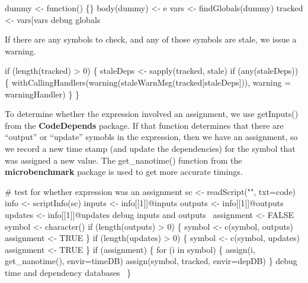 \documentclass[a4paper]{article}%
\newcommand{\pkg}[1]{{\bf #1}}
\begin{document}
\nwenddocs{}\endmoddef\nwstartdeflinemarkup{}\nwenddeflinemarkup
dummy <- function() \{\}
body(dummy) <- e
vars <- findGlobals(dummy)
tracked <- vars[vars %
\LA{}debug globals~{\nwtagstyle{}}\RA{}
\nwendcode{}\nwdocspar

If there are any symbols to check, and any of those symbols
are stale, we issue a warning.

\nwenddocs{}\endmoddef\nwstartdeflinemarkup{}\nwenddeflinemarkup
if (length(tracked) > 0) \{
    staleDeps <- sapply(tracked, stale)
    if (any(staleDeps)) \{
        withCallingHandlers(warning(staleWarnMsg(tracked[staleDeps])),
                            warning = warningHandler)
    \}
\}
\nwendcode{}\nwdocspar

To determine whether the expression involved an assignment, we
use {\Tt{}getInputs()\nwendquote} from the \pkg{CodeDepends} package.
If that function determines that there are ``output'' or ``update''
symobls in the expression, then we have an assignment,
so we record a new time stamp (and update the dependencies) for the
symbol that was assigned a new value.
The {\Tt{}get{\_}nanotime()\nwendquote} function from the \pkg{microbenchmark}
package is used to get more accurate timings.

\nwenddocs{}\endmoddef\nwstartdeflinemarkup{}\nwenddeflinemarkup
# test for whether expression was an assignment
sc <- readScript("", txt=code)
info <- scriptInfo(sc)
inputs <- info[[1]]@inputs
outputs <- info[[1]]@outputs
updates <- info[[1]]@updates
\LA{}debug inputs and outputs~{\nwtagstyle{}}\RA{}
assignment <- FALSE
symbol <- character()
if (length(outputs) > 0) \{
    symbol <- c(symbol, outputs)
    assignment <- TRUE
\}
if (length(updates) > 0) \{
    symbol <- c(symbol, updates)
    assignment <- TRUE    
\}
if (assignment) \{
    for (i in symbol) \{
        assign(i, get_nanotime(), envir=timeDB)
        assign(symbol, tracked, envir=depDB)
    \}
    \LA{}debug time and dependency databases~{\nwtagstyle{}}\RA{}
\}
\nwendcode{}\nwdocspar
\end{document}
